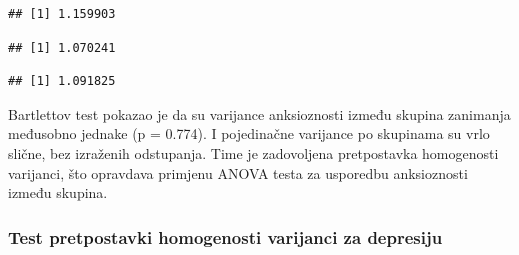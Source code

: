 \documentclass[
]{article}
\newenvironment{Shaded}{\begin{snugshade}}{\end{snugshade}}
\newcommand{\FunctionTok}[1]{\textcolor[rgb]{0.13,0.29,0.53}{\textbf{#1}}}
\newcommand{\NormalTok}[1]{#1}
\newcommand{\SpecialCharTok}[1]{\textcolor[rgb]{0.81,0.36,0.00}{\textbf{#1}}}
\newcommand{\StringTok}[1]{\textcolor[rgb]{0.31,0.60,0.02}{#1}}
\begin{document}
\begin{Shaded}
\end{Shaded}

\begin{verbatim}
## [1] 1.159903
\end{verbatim}

\begin{Shaded}
\end{Shaded}

\begin{verbatim}
## [1] 1.070241
\end{verbatim}

\begin{Shaded}
\end{Shaded}

\begin{verbatim}
## [1] 1.091825
\end{verbatim}

Bartlettov test pokazao je da su varijance anksioznosti između skupina
zanimanja međusobno jednake (p = 0.774). I pojedinačne varijance po
skupinama su vrlo slične, bez izraženih odstupanja. Time je zadovoljena
pretpostavka homogenosti varijanci, što opravdava primjenu ANOVA testa
za usporedbu anksioznosti između skupina.

\subsubsection{Test pretpostavki homogenosti varijanci za
depresiju}\label{test-pretpostavki-homogenosti-varijanci-za-depresiju}
\end{document}
